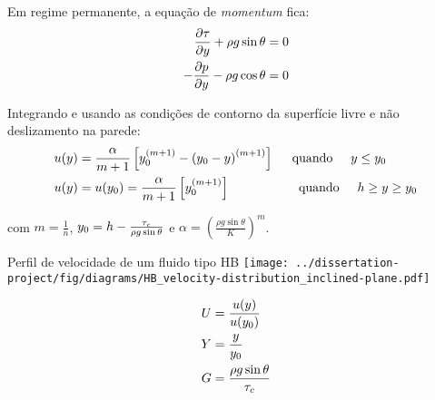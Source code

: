 \begin{frame}
    \hspace{0.5cm} Em regime permanente, a equação de \textit{momentum} fica:
    \begin{equation}
        \begin{split}
            \frac{\partial \tau}{\partial y} + \rho g \sin{\theta} &= 0 \\
            -\frac{\partial p}{\partial y} - \rho g \cos{\theta} &= 0
        \end{split}
        \label{eq:motion_steady_state_partial}
    \end{equation}

    \hspace{0.5cm} Integrando e usando as condições de contorno da superfície livre e não deslizamento na parede:
    \begin{equation}
        \begin{split}
            u(y) &= \frac{\alpha}{m+1} \left[y_0^{(m+1)} - {(y_0-y)}^{(m+1)}\right]
            \hspace{0.5cm} \text{quando} \hspace{0.5cm} y \leq y_0
            \\
            u(y) &= u(y_0) = \frac{\alpha}{m+1} \left[ y_0^{(m+1)} \right]
            \hspace{1.9cm} \text{quando} \hspace{0.5cm} h \geq y \geq y_0
        \end{split}
        \label{eq:velocity_distribution}
    \end{equation}
    
    com $m=\frac{1}{n}$, $y_0 = h - \frac{\tau_c}{\rho g \sin{\theta}}$ e $\alpha = \left({\frac{\rho g \sin{\theta}}{K}}\right)^m$.
\end{frame}

\begin{frame}
    \begin{minipage}[c]{0.65\textwidth}
        \begin{exampleblock}{Perfil de velocidade de um fluido tipo HB}
            \centering
            \texttt{[image: ../dissertation-project/fig/diagrams/HB\_velocity-distribution\_inclined-plane.pdf]}
        \end{exampleblock}
    \end{minipage}
    \hfill
    \begin{minipage}[t]{0.32\textwidth}
        \small
        \begin{equation}
            \begin{split}
                U &= \frac{u(y)}{u(y_0)} \\
                Y &= \frac{y}{y_0} \\
                G &= \frac{\rho g \sin{\theta}}{\tau_c}
            \end{split}
            \label{eq:dimensionaless_velocity_distribution}
        \end{equation}        
    \end{minipage}
\end{frame}

